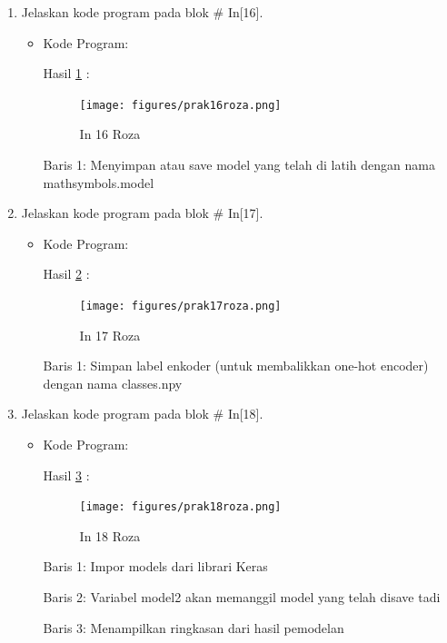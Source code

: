 \begin{enumerate}
\item Jelaskan kode program pada blok \# In[16].
\begin{itemize}
\item Kode Program:

\par Hasil \ref{in16roza} :
\begin{figure}[!hbtp]
\centering
\texttt{[image: figures/prak16roza.png]}
\caption{In 16 Roza}
\label{in16roza}
\end{figure}
\par Baris 1: Menyimpan atau save model yang telah di latih dengan nama mathsymbols.model 
\end{itemize}
\par

\item Jelaskan kode program pada blok \# In[17].
\begin{itemize}
\item Kode Program:

\par Hasil \ref{in17roza} :
\begin{figure}[!hbtp]
\centering
\texttt{[image: figures/prak17roza.png]}
\caption{In 17 Roza}
\label{in17roza}
\end{figure}
\par Baris 1: Simpan label enkoder (untuk membalikkan one-hot encoder) dengan nama classes.npy
\end{itemize}
\par

\item Jelaskan kode program pada blok \# In[18].
\begin{itemize}
\item Kode Program:

\par Hasil \ref{in18roza} :
\begin{figure}[!hbtp]
\centering
\texttt{[image: figures/prak18roza.png]}
\caption{In 18 Roza}
\label{in18roza}
\end{figure}
\par Baris 1: Impor models dari librari Keras
\par Baris 2: Variabel model2 akan memanggil model yang telah disave tadi 
\par Baris 3:  Menampilkan ringkasan dari hasil pemodelan
\end{itemize}
\par



\end{enumerate}

